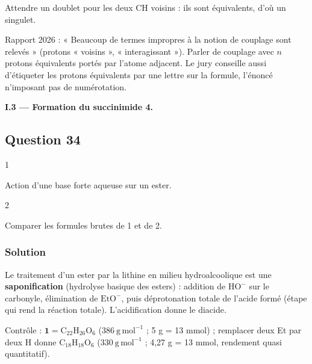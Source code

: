 \documentclass[11pt,a4paper]{article}
\begin{document}
\begin{piege}

Attendre un doublet pour les deux CH voisins : ils sont équivalents, d'où un singulet.

\end{piege}

\begin{jury}

Rapport 2026 : « Beaucoup de termes impropres à la notion de couplage sont relevés » (protons « voisins », « interagissant »). Parler de couplage avec \(n\) protons équivalents portés par l'atome adjacent. Le jury conseille aussi d'étiqueter les protons équivalents par une lettre sur la formule, l'énoncé n'imposant pas de numérotation.

\end{jury}

\textbf{I.3 --- Formation du succinimide 4.}

\hypertarget{question-34}{%
\subsection{Question 34}\label{question-34}}

\begin{indication}{1}

Action d'une base forte aqueuse sur un ester.

\end{indication}

\begin{indication}{2}

Comparer les formules brutes de 1 et de 2.

\end{indication}

\hypertarget{solution-33}{%
\subsubsection{Solution}\label{solution-33}}

Le traitement d'un ester par la lithine en milieu hydroalcoolique est une \textbf{saponification} (hydrolyse basique des esters) : addition de \(\mathrm{HO^-}\) sur le carbonyle, élimination de \(\mathrm{EtO^-}\), puis déprotonation totale de l'acide formé (étape qui rend la réaction totale). L'acidification donne le diacide.

Contrôle : \(\mathbf 1=\mathrm{C_{22}H_{26}O_6}\) (\(386\ \mathrm{g\,mol^{-1}}\) ; 5 g = 13 mmol) ; remplacer deux Et par deux H donne \(\mathrm{C_{18}H_{18}O_6}\) (\(330\ \mathrm{g\,mol^{-1}}\) ; 4,27 g = 13 mmol, rendement quasi quantitatif).
\end{document}
